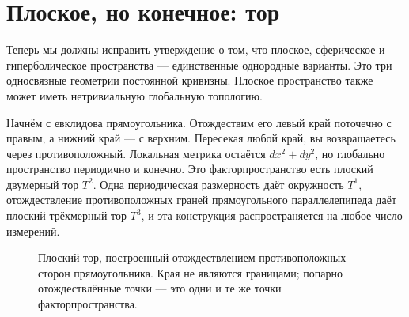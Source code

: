 \section{Плоское, но конечное: тор}

Теперь мы должны исправить утверждение о том, что плоское, сферическое и гиперболическое пространства — единственные однородные варианты. Это три односвязные геометрии постоянной кривизны. Плоское пространство также может иметь нетривиальную глобальную топологию.

Начнём с евклидова прямоугольника. Отождествим его левый край поточечно с правым, а нижний край — с верхним. Пересекая любой край, вы возвращаетесь через противоположный. Локальная метрика остаётся \(dx^2+dy^2\), но глобально пространство периодично и конечно. Это факторпространство есть плоский двумерный тор \(T^2\). Одна периодическая размерность даёт окружность \(T^1\), отождествление противоположных граней прямоугольного параллелепипеда даёт плоский трёхмерный тор \(T^3\), и эта конструкция распространяется на любое число измерений.

\begin{figure}[htbp]
\centering
{}
\caption{Плоский тор, построенный отождествлением противоположных сторон прямоугольника. Края не являются границами; попарно отождествлённые точки — это одни и те же точки факторпространства.}
\label{fig:c03-flat-torus}
\end{figure}

\begin{classroomqa}
\end{classroomqa}

